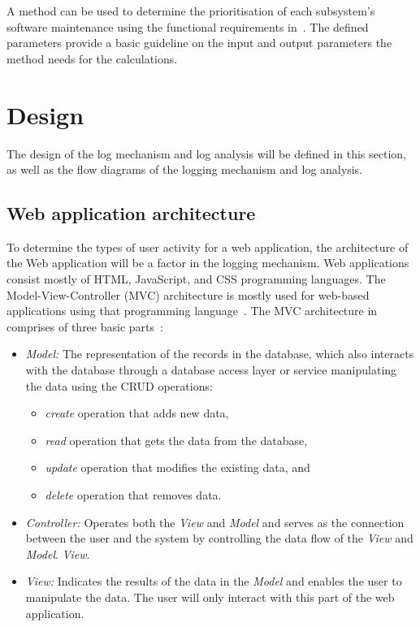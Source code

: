 A method can be used to determine the prioritisation of each subsystem's software maintenance using the functional requirements in~. The defined parameters provide a basic guideline on the input and output parameters the method needs for the calculations.

\clearpage

\section{Design}\label{sec:ch2_design}
The design of the log mechanism and log analysis will be defined in this section, as well as the flow diagrams of the logging mechanism and log analysis.

\subsection{Web application architecture}\label{sec:ch2_webApplicationArchitecture}
To determine the types of user activity for a web application, the architecture of the Web application will be a factor in the logging mechanism. Web applications consist mostly of HTML, JavaScript, and CSS programming languages. The Model-View-Controller (MVC) architecture is mostly used for web-based applications using that programming language~\cite{Jailia2016}. The MVC architecture in~ comprises of three basic parts~\cite{Jailia2016}:

\begin{itemize}
	\item \textit{Model:} The representation of the records in the database, which also interacts with the database through a database access layer or service manipulating the data using the CRUD operations:
	\begin{itemize}
		\item \textit{create} operation that adds new data,
		\item \textit{read} operation that gets the data from the database,
		\item \textit{update} operation that modifies the existing data, and
		\item \textit{delete} operation that removes data.
	\end{itemize}
	\item \textit{Controller:} Operates both the \textit{View} and \textit{Model} and serves as the connection between the user and the system by controlling the data flow of the \textit{View}  and \textit{Model}.
	\textit{View}.
	\item \textit{View:} Indicates the results of the data in the \textit{Model} and enables the user to manipulate the data. The user will only interact with this part of the web application.
\end{itemize}

